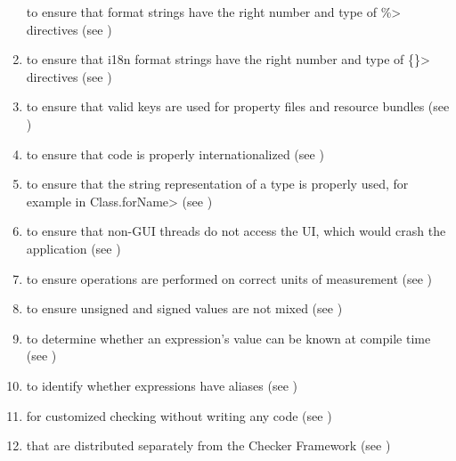 \begin{enumerate}
   to ensure that format
  strings have the right number and type of \<\%> directives (see
  )
\item
  to ensure that i18n format strings have the right number and type of
  \<\{\}> directives (see )
\item
   to ensure that valid
  keys are used for property files and resource bundles (see
  )
\item
   to
  ensure that code is properly internationalized (see
  )
\item
   to ensure that the
  string representation of a type is properly used, for example in
  \<Class.forName> (see )
\item
   to ensure that non-GUI
  threads do not access the UI, which would crash the application
  (see )
\item
   to ensure operations are
  performed on correct units of measurement
  (see )
\item
   to
  ensure unsigned and signed values are not mixed
  (see )
\item
   to determine
  whether an expression's value can be known at compile time
  (see )
\item
   to identify whether
  expressions have aliases (see )
\item
   for customized checking without
  writing any code (see )
\item
   that are distributed
  separately from the Checker Framework
  (see )

\end{enumerate}

